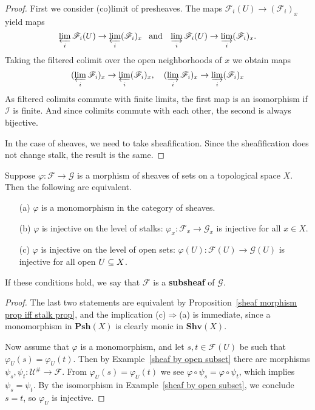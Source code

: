 \begin{proof}
First we consider (co)limit of presheaves. The maps $\mathscr{F}_i(U)\to(\mathscr{F}_i)_x$ yield maps \[\varprojlim\limits_i\mathscr{F}_i(U)\to\varprojlim\limits_i(\mathscr{F}_i)_x\hspace{8pt}\text{and}\hspace{8pt} \varinjlim\limits_i\mathscr{F}_i(U)\to\varinjlim\limits_i(\mathscr{F}_i)_x.\] 
Taking the filtered colimit over the open neighborhoods of $x$ we obtain maps
\[(\varprojlim\limits_i\mathscr{F}_i)_x\to\varprojlim\limits_i(\mathscr{F}_i)_x,\quad (\varinjlim\limits_i\mathscr{F}_i)_x\to\varinjlim\limits_i(\mathscr{F}_i)_x\]
As filtered colimits commute with finite limits, the first map is an isomorphism if $\mathcal{I}$ is finite. And since colimits commute with each other, the second is always bijective.\par
In the case of sheaves, we need to take sheafification. Since the sheafification does not change stalk, the result is the same.
\end{proof}
\begin{proposition}\label{sheaf cat monomorphism iff}
Suppose $\varphi:\mathscr{F}\to\mathscr{G}$ is a morphism of sheaves of sets on a topological space $X$. Then the following are equivalent.
\begin{itemize}
\item[(a)] $\varphi$ is a monomorphism in the category of sheaves.
\item[(b)] $\varphi$ is injective on the level of stalks: $\varphi_x:\mathscr{F}_x\to\mathscr{G}_x$ is injective for all $x\in X$.
\item[(c)] $\varphi$ is injective on the level of open sets: $\varphi(U):\mathscr{F}(U)\to\mathscr{G}(U)$ is injective for all open $U\subseteq X$.
\end{itemize}
If these conditions hold, we say that $\mathscr{F}$ is a \textbf{subsheaf} of $\mathscr{G}$.
\end{proposition}
\begin{proof}
The last two statements are equivalent by Proposition~\ref{sheaf morphism prop iff stalk prop}, and the implication (c)$\Rightarrow$(a) is immediate, since a monomorphism in $\mathbf{Psh}(X)$ is clearly monic in $\mathbf{Shv}(X)$.\par 
Now assume that $\varphi$ is a monomorphism, and let $s,t\in\mathscr{F}(U)$ be such that $\varphi_U(s)=\varphi_U(t)$. Then by Example~\ref{sheaf by open subset} there are morphisms $\psi_s,\psi_t:\mathscr{U}^{\#}\to\mathscr{F}$. From $\varphi_U(s)=\varphi_U(t)$ we see $\varphi\circ\psi_s=\varphi\circ\psi_t$, which implies $\psi_s=\psi_t$. By the isomorphism in Example~\ref{sheaf by open subset}, we conclude $s=t$, so $\varphi_U$ is injective.
\end{proof}

